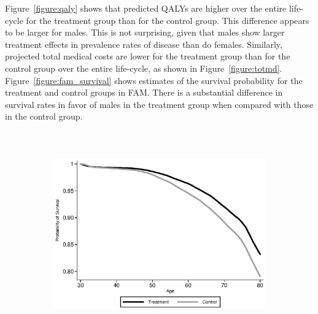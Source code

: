 \noindent Figure~\ref{figure:qaly} shows that predicted QALYs are higher over the entire life-cycle for the treatment group than for the control group. This difference appears to be larger for males. This is not surprising, given that males show larger treatment effects in prevalence rates of disease than do females. Similarly, projected total medical costs are lower for the treatment group than for the control group over the entire life-cycle, as shown in Figure~\ref{figure:totmd}.
Figure~\ref{figure:fam_survival} shows estimates of the survival probability for the treatment and control groups in FAM. There is a substantial difference in survival rates in favor of males in the treatment group when compared with those in the control group. \\


\begin{figure}[H]
    \centering
\caption{Predicted Survival} \label{figure:fam_survival}
\begin{subfigure}{.8\textwidth}
  \centering
  \includegraphics[height=3.5in]{AppOutput/Health/ABC-FAM_survival_male}
\end{subfigure}


\end{figure}
